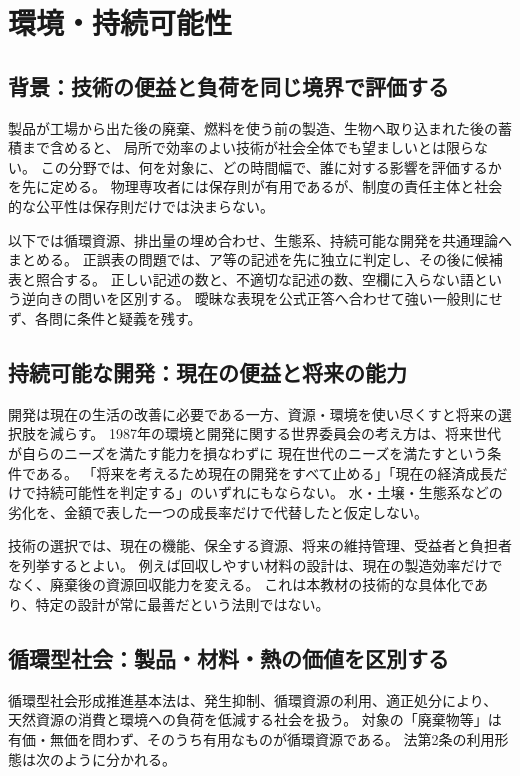 \chapter{環境・持続可能性}
\section{背景：技術の便益と負荷を同じ境界で評価する}
\label{theory:environment:boundary}
製品が工場から出た後の廃棄、燃料を使う前の製造、生物へ取り込まれた後の蓄積まで含めると、
局所で効率のよい技術が社会全体でも望ましいとは限らない。
この分野では、何を対象に、どの時間幅で、誰に対する影響を評価するかを先に定める。
物理専攻者には保存則が有用であるが、制度の責任主体と社会的な公平性は保存則だけでは決まらない。

以下では循環資源、排出量の埋め合わせ、生態系、持続可能な開発を共通理論へまとめる。
正誤表の問題では、ア等の記述を先に独立に判定し、その後に候補表と照合する。
正しい記述の数と、不適切な記述の数、空欄に入らない語という逆向きの問いを区別する。
曖昧な表現を公式正答へ合わせて強い一般則にせず、各問に条件と疑義を残す。

\section{持続可能な開発：現在の便益と将来の能力}
\label{theory:environment:development}
開発は現在の生活の改善に必要である一方、資源・環境を使い尽くすと将来の選択肢を減らす。
1987年の環境と開発に関する世界委員会の考え方は、将来世代が自らのニーズを満たす能力を損なわずに
現在世代のニーズを満たすという条件である\cite{env_development}。
「将来を考えるため現在の開発をすべて止める」「現在の経済成長だけで持続可能性を判定する」のいずれにもならない。
水・土壌・生態系などの劣化を、金額で表した一つの成長率だけで代替したと仮定しない。

技術の選択では、現在の機能、保全する資源、将来の維持管理、受益者と負担者を列挙するとよい。
例えば回収しやすい材料の設計は、現在の製造効率だけでなく、廃棄後の資源回収能力を変える。
これは本教材の技術的な具体化であり、特定の設計が常に最善だという法則ではない。

\section{循環型社会：製品・材料・熱の価値を区別する}
\label{theory:environment:circular}
循環型社会形成推進基本法は、発生抑制、循環資源の利用、適正処分により、
天然資源の消費と環境への負荷を低減する社会を扱う。
対象の「廃棄物等」は有価・無価を問わず、そのうち有用なものが循環資源である。
法第2条の利用形態は次のように分かれる\cite{env_circular_law}。

